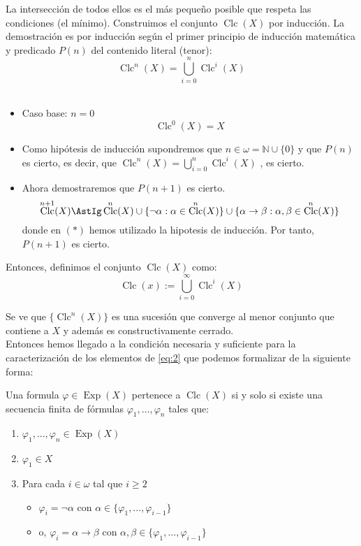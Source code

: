 \documentclass[12pt]{article}
\DeclareMathOperator{\Exp}{Exp}
\DeclareMathOperator{\Clc}{Clc}
\begin{document}
\begin{ejercicio}
La intersección de todos ellos es el más pequeño posible que respeta las condiciones (el mínimo). Construimos el conjunto $\Clc(X)$ por inducción.
La demostración es por inducción según el primer principio de inducción matemática y predicado $P(n)$ del contenido literal (tenor):
\[\Clc^n(X) = \bigcup_{i = 0}^{n} \Clc^i(X)\] \\ 

\begin{itemize}
    \item {Caso base:} $n = 0$ \\
    \[\Clc^0(X) = X\]
    \item Como hipótesis de inducción supondremos que $n \in \omega = \mathbb{N}\cup\{0\}$ y que $P(n)$ es cierto, es decir, que 
    $\Clc^n(X) = \bigcup_{i = 0}^{n} \Clc^i(X)$ , es cierto.

    \item Ahora demostraremos que $P(n+1)$ es cierto.
    \[\Clc^{n+1}(X) \AstIg \Clc^n(X)\cup\{ \lnot \alpha : \alpha \in \Clc^n(X) \}\cup\{\alpha \rightarrow \beta: \alpha, \beta \in \Clc^n(X)\} \]
    donde en $(\ast)$ hemos utilizado la hipotesis de inducción. Por tanto, $P(n+1)$ es cierto.

\end{itemize}

Entonces, definimos el conjunto $\Clc(X)$ como:
\[
  \Clc(x) := \bigcup_{i = 0}^{\infty} \Clc^i(X)
\]

Se ve que $\{\Clc^n(X)\}$ es una sucesión que converge al menor conjunto que contiene a $X$ y además es constructivamente cerrado. \\ 

Entonces hemos llegado a la condición necesaria y suficiente para la caracterización de 
los elementos de \eqref{eq:2} que podemos formalizar de la siguiente forma:

Una formula $\varphi \in \Exp(X)$ pertenece a $\Clc(X)$ si y solo si existe una secuencia
finita de fórmulas $\varphi_1, \ldots, \varphi_n$ tales que:
\begin{enumerate}
    \item $\varphi_1, ..., \varphi_n \in \Exp(X)$
    \item $\varphi_1 \in X $
    \item Para cada $i \in \omega$ tal que $i \geq 2$
    \begin{itemize}
        \item $\varphi_i = \lnot \alpha$ con $\alpha \in \{\varphi_1, ..., \varphi_{i-1}\}$
        \item o, $\varphi_i = \alpha \rightarrow \beta$ con $\alpha, \beta \in \{\varphi_1, ..., \varphi_{i-1}\}$
    \end{itemize}
\end{enumerate} 


\end{ejercicio}
\end{document}
